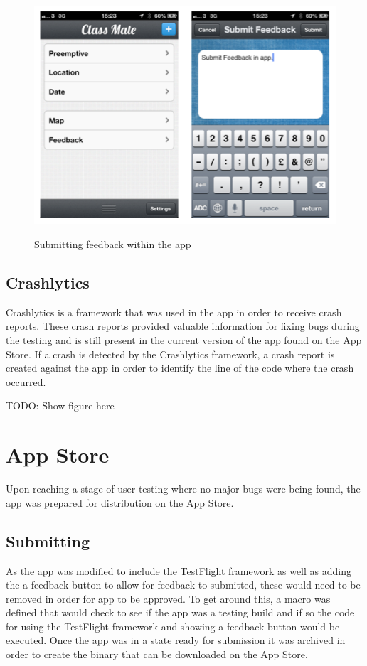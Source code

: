 \documentclass[12pt]{report}
\begin{document}
\begin{figure}[h!]
\centering
\includegraphics[scale=0.75]{images/testflight}
\label{fig:testflight}
\caption{Submitting feedback within the app}
\end{figure}

\subsection{Crashlytics}

Crashlytics \cite{crashlytics} is a framework that was used in the app in order to receive crash reports. These crash reports provided valuable information for fixing bugs during the testing and is still present in the current version of the app found on the App Store. If a crash is detected by the Crashlytics framework, a crash report is created against the app in order to identify the line of the code where the crash occurred.

TODO: Show figure here

\section{App Store}

Upon reaching a stage of user testing where no major bugs were being found, the app was prepared for distribution on the App Store. 

\subsection{Submitting}

As the app was modified to include the TestFlight framework as well as adding the a feedback button to allow for feedback to submitted, these would need to be removed in order for app to be approved. To get around this, a macro was defined that would check to see if the app was a testing build and if so the code for using the TestFlight framework and showing a feedback button would be executed. Once the app was in a state ready for submission it was archived in order to create the binary that can be downloaded on the App Store.\\
\end{document}
